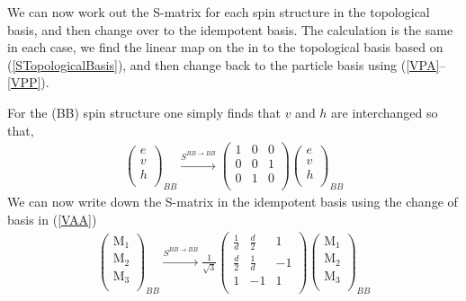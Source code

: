 \documentclass[12pt,a4paper]{article}
\newcounter{arrow}
\begin{document}
We can now work out the S-matrix for each spin structure in the topological basis, and then change over to the idempotent basis. 
The calculation is the same in each case, we find the linear map on the in to the topological basis based on (\ref{STopologicalBasis}), and then change back to the particle basis using (\ref{VPA}--\ref{VPP}).

For the (BB) spin structure one simply finds that $v$ and $h$ are interchanged so that,
\begin{align}
\left( \begin{matrix}
e\\
v\\
h\\
\end{matrix} \right)_{BB}
\xrightarrow{S^{BB \rightarrow BB}}
\left(\begin{matrix}
1& 0& 0 \\
0& 0&1  \\
0&1 &0 \\ 
\end{matrix} \right)
\left( \begin{matrix}
e\\
v\\
h\\
\end{matrix} \right)_{BB}
\end{align}
We can now write down the S-matrix in the idempotent basis using the change of basis in (\ref{VAA})
\begin{align}
\left( \begin{matrix}
\text{M}_1\\
\text{M}_2\\
\text{M}_3\\
\end{matrix} \right)_{BB} \xrightarrow{S^{BB \rightarrow BB}} 
\frac{1}{\sqrt{3}}\left( \begin{matrix}
\frac{1}{d} & \frac{d}{2} & 1\\ 
\frac{d}{2} & \frac{1}{d} & -1\\
1 & -1 & 1\\
\end{matrix} \right)
\left( \begin{matrix}
\text{M}_1\\
\text{M}_2\\
\text{M}_3\\
\end{matrix} \right)_{BB}
\end{align}
\end{document}
